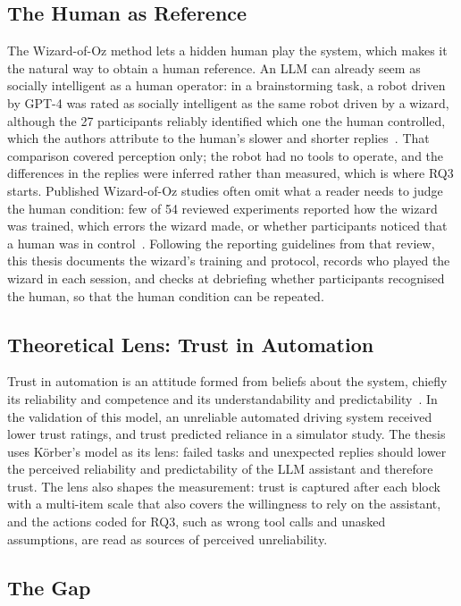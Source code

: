 \documentclass[
    a4paper,
    11pt,
    DIV=11,
    bigheadings,
    idxtotoc,
    listof=totoc,
    bibtotoc,
    halfparskip,
    cleardoubleempty,
    openright,
    oneside
]{scrartcl}
\begin{document}
\subsection{The Human as Reference}

The Wizard-of-Oz method lets a hidden human play the system, which makes it the natural way to obtain a human reference.
An LLM can already seem as socially intelligent as a human operator: in a brainstorming task, a robot driven by GPT-4 was rated as socially intelligent as the same robot driven by a wizard, although the 27 participants reliably identified which one the human controlled, which the authors attribute to the human's slower and shorter replies~\cite{Vrins24Wizard}.
That comparison covered perception only; the robot had no tools to operate, and the differences in the replies were inferred rather than measured, which is where RQ3 starts.
Published Wizard-of-Oz studies often omit what a reader needs to judge the human condition: few of 54 reviewed experiments reported how the wizard was trained, which errors the wizard made, or whether participants noticed that a human was in control~\cite{Riek12Wizard}.
Following the reporting guidelines from that review, this thesis documents the wizard's training and protocol, records who played the wizard in each session, and checks at debriefing whether participants recognised the human, so that the human condition can be repeated.

\subsection{Theoretical Lens: Trust in Automation}

Trust in automation is an attitude formed from beliefs about the system, chiefly its reliability and competence and its understandability and predictability~\cite{Koerber19Trust}.
In the validation of this model, an unreliable automated driving system received lower trust ratings, and trust predicted reliance in a simulator study.
The thesis uses Körber's model as its lens: failed tasks and unexpected replies should lower the perceived reliability and predictability of the LLM assistant and therefore trust.
The lens also shapes the measurement: trust is captured after each block with a multi-item scale that also covers the willingness to rely on the assistant, and the actions coded for RQ3, such as wrong tool calls and unasked assumptions, are read as sources of perceived unreliability.

\subsection{The Gap}
\end{document}
